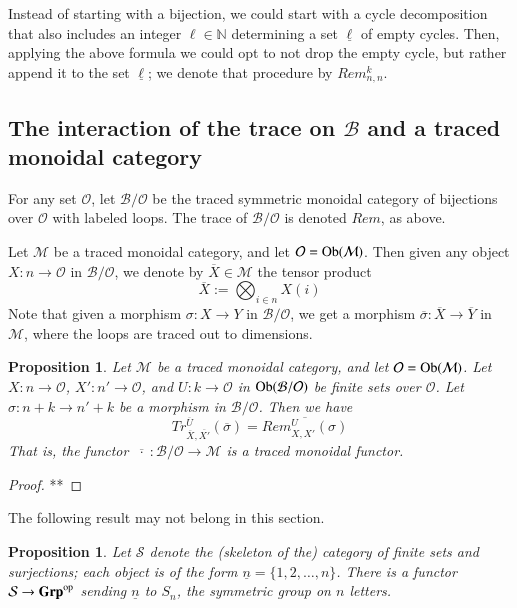 \documentclass{amsart}
\def\tn{\textnormal}
\def\mc{\mathcal}
\def\NN{{\mathbb N}}
\def\Ob{\tn{Ob}}
\def\to{\rightarrow}
\def\taking{\colon}
\def\op{^\tn{op}}
\def\ol{\overline}
\def\ul{\underline}
\def\Grp{{\bf Grp}}
\def\mcB{\mc{B}}
\def\mcM{\mc{M}}
\def\mcO{\mc{O}}
\def\mcS{\mc{S}}
\newtheorem{proposition}[subsection]{Proposition}
\theoremstyle{remark}
\theoremstyle{definition}
\begin{document}
Instead of starting with a bijection, we could start with a cycle decomposition that also includes an integer $\ell\in\NN$ determining a set $\ul\ell$ of empty cycles. Then, applying the above formula we could opt to not drop the empty cycle, but rather append it to the set $\ul\ell$; we denote that procedure by $Rem^k_{n,n}$.


\subsection{The interaction of the trace on $\mcB$ and a traced monoidal category}

For any set $\mcO$, let $\mcB/\mcO$ be the traced symmetric monoidal category of bijections over $\mcO$ with labeled loops.  The trace of $\mcB/\mcO$ is denoted $Rem$, as above.

Let $\mcM$ be a traced monoidal category, and let $\mcO=\Ob(\mcM)$. Then given any object $X\taking n\to\mcO$ in $\mcB/\mcO$, we denote by $\ol{X}\in\mcM$ the tensor product 
$$\ol{X}:=\bigotimes_{i\in n}X(i)$$
Note that given a morphism $\sigma\taking X\to Y$ in $\mcB/\mcO$, we get a morphism $\ol{\sigma}\taking\ol{X}\to\ol{Y}$ in $\mcM$, where the loops are traced out to dimensions.

\begin{proposition}

Let $\mcM$ be a traced monoidal category, and let $\mcO=\Ob(\mcM)$. Let $X\taking n\to\mcO$, $X'\taking n'\to\mcO$, and $U\taking k\to\mcO$ in $\Ob(\mcB/\mcO)$ be finite sets over $\mcO$. Let $\sigma\taking n+k\to n'+k$ be a morphism in $\mcB/\mcO$. Then we have 
$$Tr^{\ol{U}}_{\ol{X},\ol{X'}}(\ol{\sigma})=\ol{Rem^U_{X,X'}(\sigma)}$$
That is, the functor $\ol{\;\cdot\;}\taking\mcB/\mcO\to\mcM$ is a traced monoidal functor.

\end{proposition}

\begin{proof}

**

\end{proof}

The following result may not belong in this section.

\begin{proposition}

Let $\mcS$ denote the (skeleton of the) category of finite sets and surjections; each object is of the form $\ul{n}=\{1,2,\ldots,n\}$. There is a functor $\mcS\to\Grp\op$ sending $\ul{n}$ to $S_n$, the symmetric group on $n$ letters.

\end{proposition}
\end{document}
